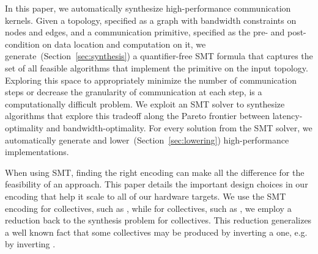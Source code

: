 In this paper, we automatically synthesize high-performance communication kernels. 
Given a topology, specified as a graph with bandwidth constraints on nodes and edges, and a communication primitive, specified as the pre- and post-condition on data location and computation on it, we generate~(Section~\ref{sec:synthesis}) a quantifier-free SMT formula that captures the set of all feasible algorithms that implement the primitive on the input topology.
Exploring this space to appropriately minimize the number of communication steps or decrease the granularity of communication at each step, is a computationally difficult problem. We exploit
an SMT solver to synthesize algorithms that explore this tradeoff along the Pareto frontier between latency-optimality and bandwidth-optimality.
For every solution from the SMT solver, we automatically generate and lower~(Section~\ref{sec:lowering}) high-performance implementations.



When using SMT, finding the right encoding can make all the difference for the
feasibility of an approach. This paper details the important design choices in
our encoding that help it scale to all of our hardware targets. We use the SMT
encoding for \broadcasting collectives, such as \broadcast, while for \reducing
collectives, such as \reduce, we employ a reduction back to the synthesis
problem for \broadcasting collectives.
This reduction generalizes a well known fact that some \reducing collectives may
be produced by inverting a \broadcasting one, e.g. \reduce by inverting \broadcast.


